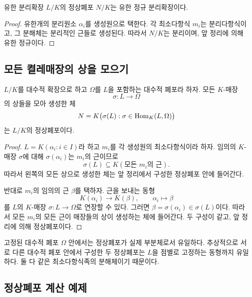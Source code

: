 \begin{corollary}
유한 분리확장 $L/K$의 정상폐포 $N/K$는 유한 정규 분리확장이다.
\end{corollary}

\begin{proof}
유한개의 분리원소 $\alpha_i$를 생성원으로 택한다. 각 최소다항식 $m_i$는 분리다항식이고, 그 분해체는 분리적인 근들로 생성된다. 따라서 $N/K$는 분리이며, 앞 정리에 의해 유한 정규이다.
\end{proof}

\subsection{모든 켤레매장의 상을 모으기}

\begin{theorem}
$L/K$를 대수적 확장으로 하고 $\Omega$를 $L$을 포함하는 대수적 폐포라 하자. 모든 $K$-매장
\[
  \sigma:L\longrightarrow\Omega
\]
의 상들을 모아 생성한 체
\[
  N=K\bigl(\sigma(L):\sigma\in\operatorname{Hom}_K(L,\Omega)\bigr)
\]
는 $L/K$의 정상폐포이다.
\end{theorem}

\begin{proof}
$L=K(\alpha_i:i\in I)$라 하고 $m_i$를 각 생성원의 최소다항식이라 하자. 임의의 $K$-매장 $\sigma$에 대해 $\sigma(\alpha_i)$는 $m_i$의 근이므로
\[
  \sigma(L)\subseteq K(\text{모든 }m_i\text{의 근}).
\]
따라서 왼쪽의 모든 상으로 생성한 체는 앞 정리에서 구성한 정상폐포 안에 들어간다.

반대로 $m_i$의 임의의 근 $\beta$를 택하자. 근을 보내는 동형
\[
  K(\alpha_i)\longrightarrow K(\beta),
  \qquad \alpha_i\longmapsto\beta
\]
를 $L$의 $K$-매장 $\sigma:L\to\Omega$로 연장할 수 있다. 그러면 $\beta=\sigma(\alpha_i)\in\sigma(L)$이다. 따라서 모든 $m_i$의 모든 근이 매장들의 상이 생성하는 체에 들어간다. 두 구성이 같고, 앞 정리에 의해 정상폐포이다.
\end{proof}

\begin{remark}[유일성]
고정된 대수적 폐포 $\Omega$ 안에서는 정상폐포가 실제 부분체로서 유일하다. 추상적으로 서로 다른 대수적 폐포 안에서 구성한 두 정상폐포는 $L$을 점별로 고정하는 동형까지 유일하다. 둘 다 같은 최소다항식족의 분해체이기 때문이다.
\end{remark}

\subsection{정상폐포 계산 예제}

